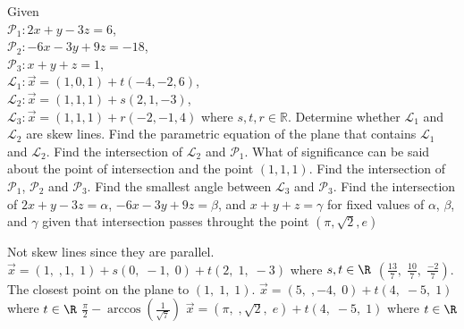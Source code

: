
\begin{Exercise}[
name={},
title={}, 
difficulty=0,
origin={\cite{YL}}]
Given\\
$\mathcal{P}_1: 2x+y-3z=6$,\\
$\mathcal{P}_2: -6x-3y+9z=-18$,\\
$\mathcal{P}_3: x+y+z=1$,\\
$\mathcal{L}_1: \vec{x}=(1,0,1)+t(-4,-2,6)$, \\
$\mathcal{L}_2: \vec{x}=(1,1,1)+s(2,1,-3)$, \\
$\mathcal{L}_3: \vec{x}=(1,1,1)+r(-2,-1,4)$ where $s, t, r\in\mathbb{R}$.
\Question Determine whether $\mathcal{L}_1$ and $\mathcal{L}_2$ are skew lines.
\Question Find the parametric equation of the plane that contains $\mathcal{L}_1$ and $\mathcal{L}_2$.
\Question Find the intersection of $\mathcal{L}_2$ and $\mathcal{P}_1$.  What of significance can be said about the point of intersection and the point $(1, 1, 1)$.
\Question Find the intersection of $\mathcal{P}_1$, $\mathcal{P}_2$ and $\mathcal{P}_3$.
\Question Find the smallest angle between $\mathcal{L}_3$ and $\mathcal{P}_3$.
\Question Find the intersection of $2x+y-3z=\alpha$, $-6x-3y+9z=\beta$, and $x+y+z=\gamma$ for fixed values of $\alpha$, $\beta$, and $\gamma$ given that intersection passes throught the point $(\pi, \sqrt{2}, e)$
\end{Exercise}

\begin{Answer}
\Question Not skew lines since they are parallel.
\Question $\vec{x} = (1,\;,1,\;1) +s(0,\;-1,\;0)+t(2,\;1,\;-3)$ where $s,t\in\R$
\Question $\left(\frac{13}{7},\;\frac{10}{7},\;\frac{-2}{7}\right)$.  The closest point on the plane to $(1,\;1,\;1)$.
\Question $\vec{x} = (5,\;,-4,\;0) +t(4,\;-5,\;1)$ where $t\in\R$
\Question $\frac{\pi}{2}-\arccos\left(\frac{1}{\sqrt{7}}\right)$
\Question $\vec{x} = (\pi,\;,\sqrt{2},\;e) +t(4,\;-5,\;1)$ where $t\in\R$
\end{Answer}
